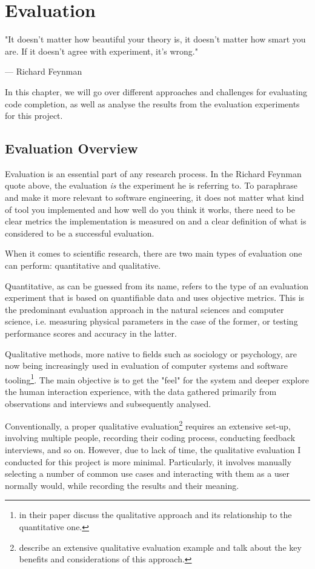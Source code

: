 \chapter{Evaluation}
\label{chap:Evaluation}

\epigraph{"It doesn't matter how beautiful your theory is, it doesn't matter how smart you are. If it doesn't agree with experiment, it's wrong."}{--- \textup{Richard Feynman}}

In this chapter, we will go over different approaches and challenges for evaluating code completion, as well as analyse the results from the evaluation experiments for this project.

\section{Evaluation Overview}
\label{sec:Evaluation-Overview}
Evaluation is an essential part of any research process. In the Richard Feynman quote above, the evaluation \textit{is} the experiment he is referring to. To paraphrase and make it more relevant to software engineering, it does not matter what kind of tool you implemented and how well do you think it works, there need to be clear metrics the implementation is measured on and a clear definition of what is considered to be a successful evaluation.

When it comes to scientific research, there are two main types of evaluation one can perform: quantitative and qualitative.

Quantitative, as can be guessed from its name, refers to the type of an evaluation experiment that is based on quantifiable data and uses objective metrics. This is the predominant evaluation approach in the natural sciences and computer science, i.e. measuring physical parameters in the case of the former, or testing performance scores and accuracy in the latter.

Qualitative methods, more native to fields such as sociology or psychology, are now being increasingly used in evaluation of computer systems and software tooling\footnote{\cite{Hazz06a} in their paper discuss the qualitative approach and its relationship to the quantitative one.}. The main objective is to get the "feel" for the system and deeper explore the human interaction experience, with the data gathered primarily from observations and interviews and subsequently analysed.

Conventionally, a proper qualitative evaluation\footnote{\cite{Kapl05a} describe an extensive qualitative evaluation example and talk about the key benefits and considerations of this approach.} requires an extensive set-up, involving multiple people, recording their coding process, conducting feedback interviews, and so on. However, due to lack of time, the qualitative evaluation I conducted for this project is more minimal. Particularly, it involves manually selecting a number of common use cases and interacting with them as a user normally would, while recording the results and their meaning.

